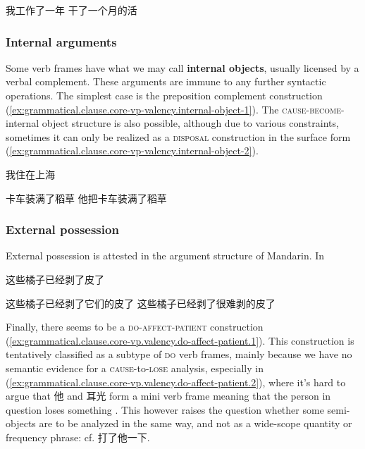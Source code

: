 \documentclass[UTF8, a4paper, oneside, scheme=plain, 12pt]{ctexrep}
\newcommand*{\concept}[1]{\textbf{#1}}
\newcommand*{\category}[1]{\textsc{#1}}
\begin{document}
\begin{exe}
    \ex\label{ex:grammatical.clause.core-vp-valency.semi-object} 我工作了一年
    \ex\label{ex:grammatical.clause.core-vp-valency.pseudo-attributive} 干了一个月的活
\end{exe}

\subsubsection{Internal arguments}\label{sec:grammatical.clause.core-vp.internal}

Some verb frames have what we may call \concept{internal objects}, usually licensed by a verbal complement.
These arguments are immune to any further syntactic operations.
The simplest case is the preposition complement construction (\ref{ex:grammatical.clause.core-vp-valency.internal-object-1}).
The \category{cause}-\category{become}-internal object structure is also possible,
although due to various constraints, sometimes it can only be realized as a \category{disposal} construction in the surface form (\ref{ex:grammatical.clause.core-vp-valency.internal-object-2}).


\begin{exe}
    \ex\label{ex:grammatical.clause.core-vp-valency.internal-object-1}
    我住在上海
    \ex\label{ex:grammatical.clause.core-vp-valency.internal-object-2} 
    \begin{xlist}
        \ex 卡车装满了稻草
        \ex 他把卡车装满了稻草
    \end{xlist}
\end{exe}

\subsubsection{External possession}

External possession is attested in the argument structure of Mandarin.
In 

\begin{exe}
    \ex 这些橘子已经剥了皮了
    \ex\begin{xlist}
        \ex *这些橘子已经剥了它们的皮了
        \ex *这些橘子已经剥了很难剥的皮了
    \end{xlist}
\end{exe}

Finally, there seems to be a \category{do}-\category{affect}-\category{patient} construction
(\ref{ex:grammatical.clause.core-vp.valency.do-affect-patient.1}).
This construction is tentatively classified as a subtype of \category{do} verb frames,
mainly because we have no semantic evidence for a \category{cause}-to-\category{lose} analysis,
especially in (\ref{ex:grammatical.clause.core-vp.valency.do-affect-patient.2}),
where it's hard to argue that 他 and 耳光 form a mini verb frame meaning that the person in question loses something
\citep{huang2007}.
This however raises the question whether some semi-objects are to be analyzed in the same way,
and not as a wide-scope quantity or frequency phrase: cf. 打了他一下.
\end{document}
